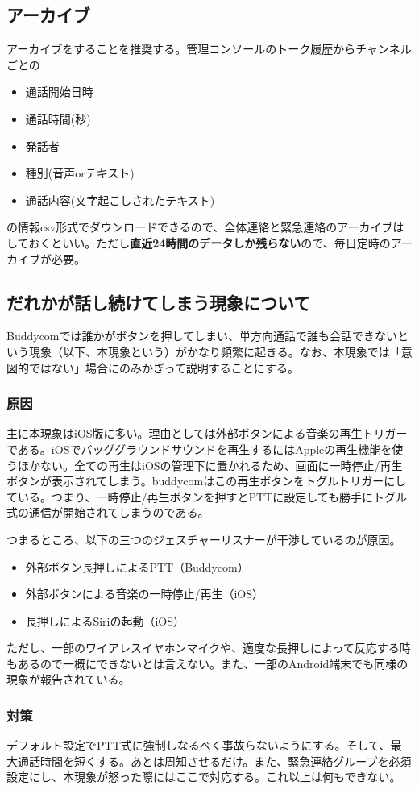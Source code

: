\documentclass[a4paper]{ltjsreport}
\newcommand{\impact}[1]{\textbf{\gtfamily #1}}
\begin{document}
\subsection{アーカイブ}
アーカイブをすることを推奨する。管理コンソールのトーク履歴からチャンネルごとの
\begin{itemize}
  \item 通話開始日時
  \item 通話時間(秒)
  \item 発話者
  \item 種別(音声orテキスト)
  \item 通話内容(文字起こしされたテキスト)
\end{itemize}
の情報csv形式でダウンロードできるので、全体連絡と緊急連絡のアーカイブはしておくといい。ただし\impact{直近24時間のデータしか残らない}ので、毎日定時のアーカイブが必要。

\subsection{だれかが話し続けてしまう現象について}
Buddycomでは誰かがボタンを押してしまい、単方向通話で誰も会話できないという現象（以下、本現象という）がかなり頻繁に起きる。なお、本現象では「意図的ではない」場合にのみかぎって説明することにする。
\subsubsection{原因}
主に本現象はiOS版に多い。理由としては外部ボタンによる音楽の再生トリガーである。iOSでバッググラウンドサウンドを再生するにはAppleの再生機能を使うほかない。全ての再生はiOSの管理下に置かれるため、画面に一時停止/再生ボタンが表示されてしまう。buddycomはこの再生ボタンをトグルトリガーにしている。つまり、一時停止/再生ボタンを押すとPTTに設定しても勝手にトグル式の通信が開始されてしまうのである。
\par
つまるところ、以下の三つのジェスチャーリスナーが干渉しているのが原因。
\begin{itemize}
  \item 外部ボタン長押しによるPTT（Buddycom）
  \item 外部ボタンによる音楽の一時停止/再生（iOS）
  \item 長押しによるSiriの起動（iOS）
\end{itemize}
ただし、一部のワイアレスイヤホンマイクや、適度な長押しによって反応する時もあるので一概にできないとは言えない。また、一部のAndroid端末でも同様の現象が報告されている。
\subsubsection{対策}
デフォルト設定でPTT式に強制しなるべく事故らないようにする。そして、最大通話時間を短くする。あとは周知させるだけ。また、緊急連絡グループを必須設定にし、本現象が怒った際にはここで対応する。これ以上は何もできない。
\end{document}
